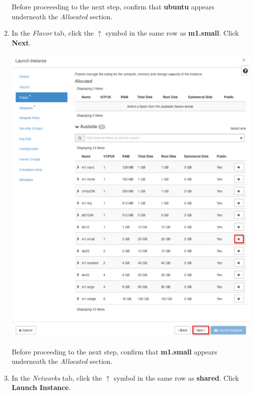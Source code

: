 \documentclass[letterpaper, 12pt]{article}
\begin{document}
\begin{enumerate}
    \begin{stopbox}
        Before proceeeding to the next step, confirm that \textbf{ubuntu} appears underneath the \textit{Allocated}
        section.
    \end{stopbox}

    \item In the \textit{Flavor} tab, click the $\uparrow$ symbol in the same row as \textbf{m1.small}. Click
    \textbf{Next}.

    \begin{center}
        \includegraphics[width=\linewidth]{images/part1/step7.png}
    \end{center}

    \begin{stopbox}
        Before proceeding to the next step, confirm that \textbf{m1.small} appears underneath the \textit{Allocated}
        section.
    \end{stopbox}

    \item In the \textit{Networks} tab, click the $\uparrow$ symbol in the same row as \textbf{shared}. Click
    \textbf{Launch Instance}.


\end{enumerate}
\end{document}
